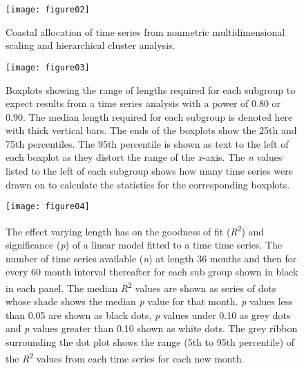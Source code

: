 \documentclass{ametsoc}
\begin{document}
\begin{figure}
\centering \texttt{[image: figure02]}
\caption[\small Coastal allocation of time series from nonmetric multidimensional scaling and hierarchical cluster analysis]{Coastal allocation of time series from nonmetric multidimensional scaling and hierarchical cluster analysis.}
\label{figure02}
\end{figure}

\begin{figure}
\centering \texttt{[image: figure03]}
\caption[\small Boxplots showing the range of lengths required for each subgroup to expect results from a time series analysis with a power of 0.80 or 0.90]{Boxplots showing the range of lengths required for each subgroup to expect results from a time series analysis with a power of 0.80 or 0.90. The median length required for each subgroup is denoted here with thick vertical bars. The ends of the boxplots show the 25th and 75th percentiles. The 95th percentile is shown as text to the left of each boxplot as they distort the range of the \emph{x}-axis. The \emph{n} values listed to the left of each subgroup shows how many time series were drawn on to calculate the statistics for the corresponding boxplots.}
\label{figure03}
\end{figure}

\begin{figure}
\centering \texttt{[image: figure04]}
\caption[\small The effect varying length has on the goodness of fit (\emph{R}\textsuperscript{2}) and significance (\emph{p}) of a linear model fitted to a time time series]{The effect varying length has on the goodness of fit (\emph{R}\textsuperscript{2}) and significance (\emph{p}) of a linear model fitted to a time time series. The number of time series available (\emph{n}) at length 36 months and then for every 60 month interval thereafter for each sub group shown in black in each panel. The median \emph{R}\textsuperscript{2} values are shown as series of dots whose shade shows the median \emph{p} value for that month. \emph{p} values less than 0.05 are shown as black dots, \emph{p} values under 0.10 as grey dots and \emph{p} values greater than 0.10 shown as white dots. The grey ribbon surrounding the dot plot shows the range (5th to 95th percentile) of the \emph{R}\textsuperscript{2} values from each time series for each new month.}
\label{figure04}
\end{figure}
\end{document}
